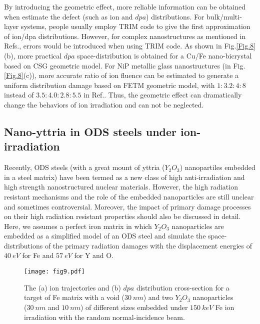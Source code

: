 By introducing the geometric effect, more reliable information can be obtained when estimate the defect (such as ion and $dpa$) distributions. For bulk/multi-layer systems, people usually employ TRIM code to give the first approximation of ion/dpa distributions. However, for complex nanostructures as mentioned in Refs.\cite{Liontas:2014,Landau:2014}, errors would be introduced when using TRIM code. As shown in Fig.\ref{Fig.8}(b), more practical $dpa$ space-distribution is obtained for a Cu/Fe nano-bicrystal based on CSG geometric model. For NiP metallic glass nanostructures (in Fig.\ref{Fig.8}(c)), more accurate ratio of ion fluence can be estimated to generate a uniform distribution damage based on FETM geometric model, with $1:3.2:4:8$ instead of $3.5:4.0:2.8:5.5$ in Ref.\cite{Liontas:2014}. Thus, the geometric effect can dramatically change the behaviors of ion irradiation and can not be neglected.

\subsection{Nano-yttria in ODS steels under ion-irradiation}

Recently, ODS steels (with a great mount of yttria ($Y_2O_3$) nanopartiles embedded in a steel matrix) have been termed as a new class of high anti-irradiation and high strength nanostructured nuclear materials\cite{Chen:2013,Brimbal:2014,Fave:2014,Huang:2014,Lazauskas:2013,Lescoat:2012}. However, the high radiation resistant mechanisms and the role of the embedded nanoparticles are still unclear and sometimes controversial. Moreover, the impact of primary damage processes on their high radiation resistant properties should also be discussed in detail. Here, we assumes a perfect iron matrix in which $Y_2O_3$ nanoparticles are embedded as a simplified model of an ODS steel and simulate the space-distributions of the primary radiation damages with the displacement energies of $40~eV$\cite{Ziegler:2010} for Fe and $57~eV$ for Y and O\cite{Lescoat:2012}.

\begin{figure}[!ht]\centering
\texttt{[image: fig9.pdf]}
\caption{The (a) ion trajectories and (b) $dpa$ distribution cross-section for a target of Fe matrix with a void ($30~nm$) and two $Y_2O_3$ nanoparticles ($30~nm$ and $10~nm$) of different sizes embedded under $150~keV$ Fe ion irradiation with the random normal-incidence beam.} \label{Fig.9}
\end{figure}

